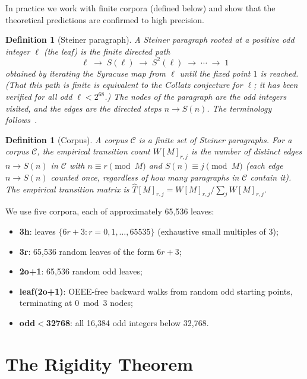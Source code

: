 \documentclass[12pt,a4paper]{article}
\newtheorem{definition}[theorem]{Definition}
\begin{document}
In practice we work with finite corpora (defined below) and show that the
theoretical predictions are confirmed to high precision.

\begin{definition}[Steiner paragraph]
\label{def:paragraph}
A \emph{Steiner paragraph} rooted at a positive odd integer $\ell$
(the \emph{leaf}) is the finite directed path
\[
  \ell \;\to\; S(\ell) \;\to\; S^2(\ell) \;\to\; \cdots \;\to\; 1
\]
obtained by iterating the Syracuse map from $\ell$ until the fixed point $1$ is
reached.  (That this path is finite is equivalent to the Collatz conjecture for
$\ell$; it has been verified for all odd $\ell < 2^{68}$.)  The \emph{nodes} of
the paragraph are the odd integers visited, and the \emph{edges} are the
directed steps $n \to S(n)$.  The terminology follows~\cite{paper67}.
\end{definition}

\begin{definition}[Corpus]
\label{def:corpus}
A \emph{corpus} $\mathcal{C}$ is a finite set of Steiner paragraphs.  For a
corpus $\mathcal{C}$, the \emph{empirical transition count} $W[M]_{r,j}$ is the
number of \emph{distinct} edges $n \to S(n)$ in $\mathcal{C}$ with
$n \equiv r \pmod{M}$ and $S(n) \equiv j \pmod{M}$ (each edge $n \to S(n)$
counted once, regardless of how many paragraphs in $\mathcal{C}$ contain it).
The \emph{empirical transition matrix} is
$\hat{T}[M]_{r,j} = W[M]_{r,j} / \sum_j W[M]_{r,j}$.
\end{definition}

We use five corpora, each of approximately 65{,}536 leaves:
\begin{itemize}
  \item \textbf{3h}: leaves $\{6r+3 : r = 0, 1, \ldots, 65535\}$ (exhaustive
        small multiples of 3);
  \item \textbf{3r}: 65{,}536 random leaves of the form $6r+3$;
  \item \textbf{2o+1}: 65{,}536 random odd leaves;
  \item \textbf{leaf(2o+1)}: OEEE-free backward walks from random odd starting
        points, terminating at $0 \bmod 3$ nodes;
  \item \textbf{odd$<$32768}: all 16{,}384 odd integers below 32{,}768.
\end{itemize}

\section{The Rigidity Theorem}
\label{sec:rigidity}
\end{document}
